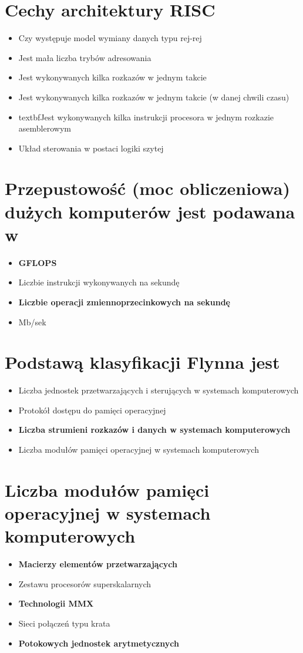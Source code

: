 \documentclass[a4paper,twoside]{article}
\begin{document}
\section{Cechy architektury RISC}
	\begin{itemize}
    \item Czy występuje model wymiany danych typu rej-rej
    \item Jest mała liczba trybów adresowania
    \item Jest wykonywanych kilka rozkazów w jednym takcie
    \item Jest wykonywanych kilka rozkazów w jednym takcie (w danej chwili czasu)
    \item textbf{Jest wykonywanych kilka instrukcji procesora w jednym rozkazie asemblerowym}
    \item Układ sterowania w postaci logiki szytej
    \end{itemize}

\section{Przepustowość (moc obliczeniowa) dużych komputerów jest podawana w}
	\begin{itemize}
    \item \textbf{GFLOPS}
    \item Liczbie instrukcji wykonywanych na sekundę
    \item \textbf{Liczbie operacji zmiennoprzecinkowych na sekundę}
    \item Mb/sek
    \end{itemize}

\section{Podstawą klasyfikacji Flynna jest}
	\begin{itemize}
    \item Liczba jednostek przetwarzających i sterujących w systemach komputerowych
    \item Protokół dostępu do pamięci operacyjnej
    \item \textbf{Liczba strumieni rozkazów i danych w systemach komputerowych}
    \item Liczba modułów pamięci operacyjnej w systemach komputerowych
    \end{itemize}

\section{Liczba modułów pamięci operacyjnej w systemach komputerowych}
	\begin{itemize}
    \item \textbf{Macierzy elementów przetwarzających}
    \item Zestawu procesorów superskalarnych
    \item \textbf{Technologii MMX}
    \item Sieci połączeń typu krata
    \item \textbf{Potokowych jednostek arytmetycznych}
    \end{itemize}
\end{document}
